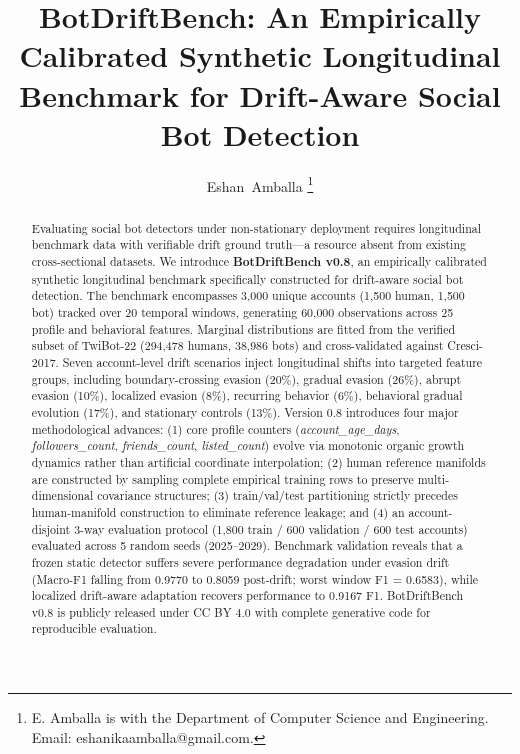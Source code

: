 \documentclass[journal]{IEEEtran}
\begin{document}
\title{BotDriftBench: An Empirically Calibrated Synthetic Longitudinal Benchmark for Drift-Aware Social Bot Detection}

\author{Eshan~Amballa%
\thanks{E. Amballa is with the Department of Computer Science and Engineering. Email: eshanikaamballa@gmail.com.}}

\maketitle

\begin{abstract}
Evaluating social bot detectors under non-stationary deployment requires longitudinal benchmark data with verifiable drift ground truth---a resource absent from existing cross-sectional datasets. We introduce \textbf{BotDriftBench v0.8}, an empirically calibrated synthetic longitudinal benchmark specifically constructed for drift-aware social bot detection. The benchmark encompasses 3,000 unique accounts (1,500 human, 1,500 bot) tracked over 20 temporal windows, generating 60,000 observations across 25 profile and behavioral features. Marginal distributions are fitted from the verified subset of TwiBot-22 (294,478 humans, 38,986 bots) and cross-validated against Cresci-2017. Seven account-level drift scenarios inject longitudinal shifts into targeted feature groups, including boundary-crossing evasion (20\%), gradual evasion (26\%), abrupt evasion (10\%), localized evasion (8\%), recurring behavior (6\%), behavioral gradual evolution (17\%), and stationary controls (13\%). Version 0.8 introduces four major methodological advances: (1) core profile counters (\textit{account\_age\_days}, \textit{followers\_count}, \textit{friends\_count}, \textit{listed\_count}) evolve via monotonic organic growth dynamics rather than artificial coordinate interpolation; (2) human reference manifolds are constructed by sampling complete empirical training rows to preserve multi-dimensional covariance structures; (3) train/val/test partitioning strictly precedes human-manifold construction to eliminate reference leakage; and (4) an account-disjoint 3-way evaluation protocol (1,800 train / 600 validation / 600 test accounts) evaluated across 5 random seeds (2025--2029). Benchmark validation reveals that a frozen static detector suffers severe performance degradation under evasion drift (Macro-F1 falling from 0.9770 to 0.8059 post-drift; worst window F1 = 0.6583), while localized drift-aware adaptation recovers performance to 0.9167 F1. BotDriftBench v0.8 is publicly released under CC BY 4.0 with complete generative code for reproducible evaluation.
\end{abstract}
\end{document}
